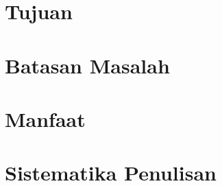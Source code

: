 \section{Tujuan}



\section{Batasan Masalah}



\section{Manfaat}



\section{Sistematika Penulisan}

\vspace{3mm}


